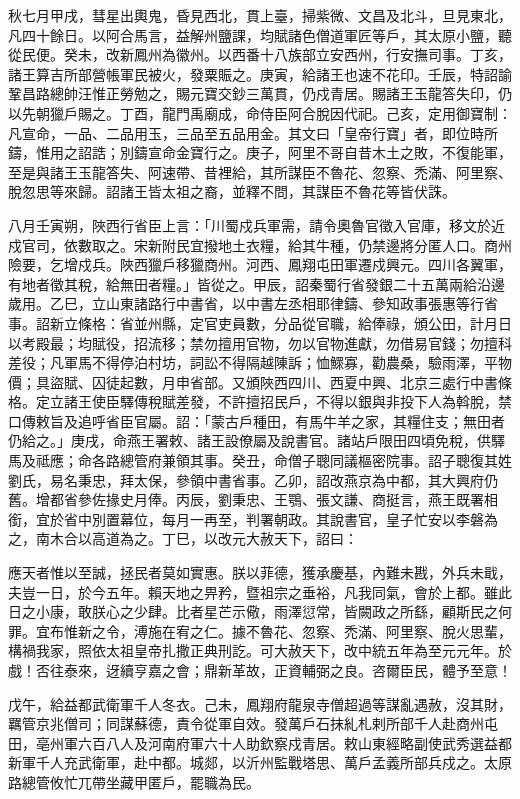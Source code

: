 \begin{pinyinscope}
 秋七月甲戌，彗星出輿鬼，昏見西北，貫上臺，掃紫微、文昌及北斗，旦見東北，凡四十餘日。以阿合馬言，益解州鹽課，均賦諸色僧道軍匠等戶，其太原小鹽，聽從民便。癸未，改新鳳州為徽州。以西番十八族部立安西州，行安撫司事。丁亥，諸王算吉所部營帳軍民被火，發粟賑之。庚寅，給諸王也速不花印。壬辰，特詔諭鞏昌路總帥汪惟正勞勉之，賜元寶交鈔三萬貫，仍戍青居。賜諸王玉龍答失印，仍以先朝獵戶賜之。丁酉，龍門禹廟成，命侍臣阿合脫因代祀。己亥，定用御寶制：凡宣命，一品、二品用玉，三品至五品用金。其文曰「皇帝行寶」者，即位時所鑄，惟用之詔誥；別鑄宣命金寶行之。庚子，阿里不哥自昔木土之敗，不復能軍，至是與諸王玉龍答失、阿速帶、昔裡給，其所謀臣不魯花、忽察、禿滿、阿里察、脫忽思等來歸。詔諸王皆太祖之裔，並釋不問，其謀臣不魯花等皆伏誅。



 八月壬寅朔，陜西行省臣上言：「川蜀戍兵軍需，請令奧魯官徵入官庫，移文於近戍官司，依數取之。宋新附民宜撥地土衣糧，給其牛種，仍禁邊將分匿人口。商州險要，乞增戍兵。陜西獵戶移獵商州。河西、鳳翔屯田軍遷戍興元。四川各翼軍，有地者徵其稅，給無田者糧。」皆從之。甲辰，詔秦蜀行省發銀二十五萬兩給沿邊歲用。乙巳，立山東諸路行中書省，以中書左丞相耶律鑄、參知政事張惠等行省事。詔新立條格：省並州縣，定官吏員數，分品從官職，給俸祿，頒公田，計月日以考殿最；均賦役，招流移；禁勿擅用官物，勿以官物進獻，勿借易官錢；勿擅科差役；凡軍馬不得停泊村坊，詞訟不得隔越陳訴；恤鰥寡，勸農桑，驗雨澤，平物價；具盜賦、囚徒起數，月申省部。又頒陜西四川、西夏中興、北京三處行中書條格。定立諸王使臣驛傳稅賦差發，不許擅招民戶，不得以銀與非投下人為斡脫，禁口傳敕旨及追呼省臣官屬。詔：「蒙古戶種田，有馬牛羊之家，其糧住支；無田者仍給之。」庚戌，命燕王署敕、諸王設僚屬及說書官。諸站戶限田四頃免稅，供驛馬及祗應；命各路總管府兼領其事。癸丑，命僧子聰同議樞密院事。詔子聰復其姓劉氏，易名秉忠，拜太保，參領中書省事。乙卯，詔改燕京為中都，其大興府仍舊。增都省參佐掾史月俸。丙辰，劉秉忠、王鶚、張文謙、商挺言，燕王既署相銜，宜於省中別置幕位，每月一再至，判署朝政。其說書官，皇子忙安以李磐為之，南木合以高道為之。丁巳，以改元大赦天下，詔曰：



 應天者惟以至誠，拯民者莫如實惠。朕以菲德，獲承慶基，內難未戡，外兵未戢，夫豈一日，於今五年。賴天地之畀矜，暨祖宗之垂裕，凡我同氣，會於上都。雖此日之小康，敢朕心之少肆。比者星芒示儆，雨澤愆常，皆闕政之所繇，顧斯民之何罪。宜布惟新之令，溥施在宥之仁。據不魯花、忽察、禿滿、阿里察、脫火思輩，構禍我家，照依太祖皇帝扎撒正典刑訖。可大赦天下，改中統五年為至元元年。於戲！否往泰來，迓續亨嘉之會；鼎新革故，正資輔弼之良。咨爾臣民，體予至意！



 戊午，給益都武衛軍千人冬衣。己未，鳳翔府龍泉寺僧超過等謀亂遇赦，沒其財，羈管京兆僧司；同謀蘇德，責令從軍自效。發萬戶石抹糺札剌所部千人赴商州屯田，亳州軍六百八人及河南府軍六十人助欽察戍青居。敕山東經略副使武秀選益都新軍千人充武衛軍，赴中都。城郯，以沂州監戰塔思、萬戶孟義所部兵戍之。太原路總管攸忙兀帶坐藏甲匿戶，罷職為民。




\end{pinyinscope}
